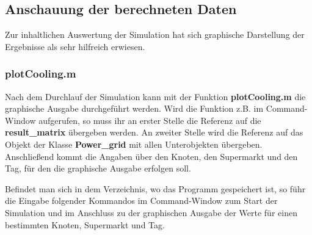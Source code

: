 \subsection*{Anschauung der berechneten Daten}
Zur inhaltlichen Auswertung der Simulation hat sich graphische Darstellung der
Ergebnisse als sehr hilfreich erwiesen.

\subsubsection*{plotCooling.m}
Nach dem Durchlauf der Simulation kann mit der Funktion \textbf{plotCooling.m}
die graphische Ausgabe durchgef\"uhrt werden. Wird die Funktion z.B. im \matlab
Command-Window aufgerufen, so muss ihr an erster Stelle die Referenz auf die
\textbf{result\_matrix} \"ubergeben werden. An zweiter Stelle wird die Referenz auf das
Objekt der Klasse \textbf{Power\_grid} mit allen Unterobjekten \"ubergeben.
Anschlie\ss end kommt die Angaben \"uber den Knoten, den Supermarkt und den Tag,
f\"ur den die graphische Ausgabe erfolgen soll.

Befindet man sich in dem Verzeichnis, wo das Programm gespeichert ist, so f\"uhr
die Eingabe folgender Kommandos im \matlab Command-Window zum Start der
Simulation und im Anschluss zu der graphischen Ausgabe der Werte f\"ur einen
bestimmten Knoten, Supermarkt und Tag.


